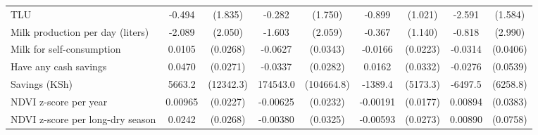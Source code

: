 \begin{tabular}{l*{4}{cc}}
TLU         &      -0.494   &     (1.835)&      -0.282   &     (1.750)&      -0.899   &     (1.021)&      -2.591   &     (1.584)\\
Milk production per day (liters)&      -2.089   &     (2.050)&      -1.603   &     (2.059)&      -0.367   &     (1.140)&      -0.818   &     (2.990)\\
Milk for self-consumption&      0.0105   &    (0.0268)&     -0.0627   &    (0.0343)&     -0.0166   &    (0.0223)&     -0.0314   &    (0.0406)\\
Have any cash savings&      0.0470   &    (0.0271)&     -0.0337   &    (0.0282)&      0.0162   &    (0.0332)&     -0.0276   &    (0.0539)\\
Savings (KSh)&      5663.2   &   (12342.3)&    174543.0   &  (104664.8)&     -1389.4   &    (5173.3)&     -6497.5   &    (6258.8)\\
NDVI z-score per year&     0.00965   &    (0.0227)&    -0.00625   &    (0.0232)&    -0.00191   &    (0.0177)&     0.00894   &    (0.0383)\\
NDVI z-score per long-dry season&      0.0242   &    (0.0268)&    -0.00380   &    (0.0325)&    -0.00593   &    (0.0273)&     0.00890   &    (0.0758)\\
\bottomrule
\end{tabular}
